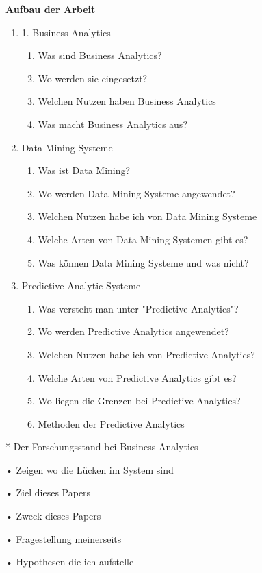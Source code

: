 \documentclass[12pt,twocolumn,twoside]{conference}   %
\begin{document}
\begin{list}{}
	\item {\color{red} \textbf{Aufbau der Arbeit} }
	\begin{enumerate}
		\item{1.}  Business Analytics
			\begin{enumerate}
				\item Was sind Business Analytics?
				\item Wo werden sie eingesetzt?
				\item Welchen Nutzen haben Business Analytics
				\item Was macht Business Analytics aus?
			\end{enumerate}				
		\item Data Mining Systeme
		\begin{enumerate}
			\item Was ist Data Mining?
			\item Wo werden Data Mining Systeme angewendet?
			\item Welchen Nutzen habe ich von Data Mining Systeme
			\item Welche Arten von Data Mining Systemen gibt es?
			\item Was können Data Mining Systeme und was nicht?
		\end{enumerate}	
		
		\item Predictive Analytic Systeme
		\begin{enumerate}
			\item Was versteht man unter "Predictive Analytics"?
			\item Wo werden Predictive Analytics angewendet?
			\item Welchen Nutzen habe ich von Predictive Analytics?
			\item Welche Arten von Predictive Analytics gibt es?
			\item Wo liegen die Grenzen bei Predictive Analytics?
			\item Methoden der Predictive Analytics
		\end{enumerate}
	\end{enumerate}
\end{list}


\begin{list}{}
\item[*] Der Forschungsstand bei Business Analytics
\item[•] Zeigen wo die Lücken im System sind
\item[•] Ziel dieses Papers
\item[•] Zweck dieses Papers
\item[•] Fragestellung meinerseits
\item[•] Hypothesen die ich aufstelle
\end{list}
\end{document}
